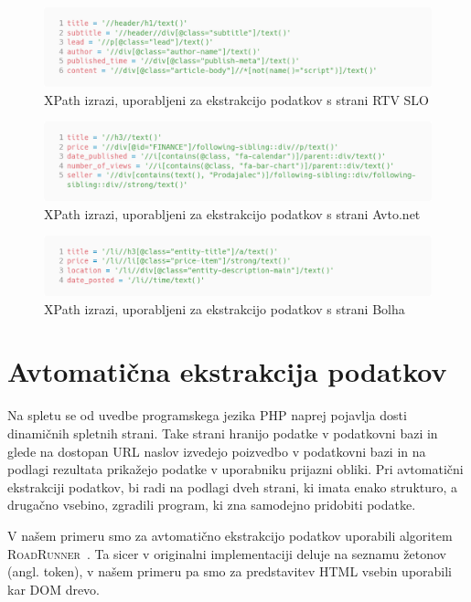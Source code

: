 \documentclass[conference]{IEEEtran}
\begin{document}
	\begin{figure}
		\centering
		\includegraphics[width=0.9\linewidth]{images/rtvslo_xpath}
		\caption{XPath izrazi, uporabljeni za ekstrakcijo podatkov s strani RTV SLO}
		\label{fig:rtvslo-xpath}
	\end{figure}

	\begin{figure}
		\centering
		\includegraphics[width=0.9\linewidth]{images/avtonet_xpath}
		\caption{XPath izrazi, uporabljeni za ekstrakcijo podatkov s strani Avto.net}
		\label{fig:avtonet-xpath}
	\end{figure}

	\begin{figure}
		\centering
		\includegraphics[width=0.9\linewidth]{images/bolha_xpath}
		\caption{XPath izrazi, uporabljeni za ekstrakcijo podatkov s strani Bolha}
		\label{fig:bolha-xpath}
	\end{figure}
	
	\section{Avtomatična ekstrakcija podatkov}
	
	Na spletu se od uvedbe programskega jezika PHP naprej pojavlja dosti dinamičnih spletnih strani. Take strani hranijo podatke v podatkovni bazi in glede na dostopan URL naslov izvedejo poizvedbo v podatkovni bazi in na podlagi rezultata prikažejo podatke v uporabniku prijazni obliki. Pri avtomatični ekstrakciji podatkov, bi radi na podlagi dveh strani, ki imata enako strukturo, a drugačno vsebino, zgradili program, ki zna samodejno pridobiti podatke.
	
	V našem primeru smo za avtomatično ekstrakcijo podatkov uporabili algoritem \textsc{RoadRunner}~\cite{roadrunner, crescenzi2001automatic}. Ta sicer v originalni implementaciji deluje na seznamu žetonov (angl. token), v našem primeru pa smo za predstavitev HTML vsebin uporabili kar DOM drevo.
	
\end{document}
